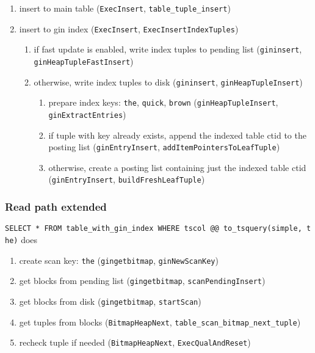 \documentclass[
]{article}
\providecommand{\tightlist}{%
  \setlength{\itemsep}{0pt}\setlength{\parskip}{0pt}}
\begin{document}
\begin{enumerate}
\def\labelenumi{\arabic{enumi}.}
\tightlist
\item
  insert to main table (\texttt{ExecInsert},
  \texttt{table\_tuple\_insert})
\item
  insert to gin index (\texttt{ExecInsert},
  \texttt{ExecInsertIndexTuples})

  \begin{enumerate}
  \def\labelenumii{\arabic{enumii}.}
  \tightlist
  \item
    if fast update is enabled, write index tuples to pending list
    (\texttt{gininsert}, \texttt{ginHeapTupleFastInsert})
  \item
    otherwise, write index tuples to disk (\texttt{gininsert},
    \texttt{ginHeapTupleInsert})

    \begin{enumerate}
    \def\labelenumiii{\arabic{enumiii}.}
    \tightlist
    \item
      prepare index keys: \texttt{the}, \texttt{quick}, \texttt{brown}
      (\texttt{ginHeapTupleInsert}, \texttt{ginExtractEntries})
    \item
      if tuple with key already exists, append the indexed table ctid to
      the posting list (\texttt{ginEntryInsert},
      \texttt{addItemPointersToLeafTuple})
    \item
      otherwise, create a posting list containing just the indexed table
      ctid (\texttt{ginEntryInsert}, \texttt{buildFreshLeafTuple})
    \end{enumerate}
  \end{enumerate}
\end{enumerate}

\hypertarget{read-path-extended}{%
\subsubsection{Read path extended}\label{read-path-extended}}

\texttt{SELECT\ *\ FROM\ table\_with\_gin\_index\ WHERE\ tscol\ @@\ to\_tsquery(\textquotesingle{}simple\textquotesingle{},\ \textquotesingle{}the\textquotesingle{})}
does

\begin{enumerate}
\def\labelenumi{\arabic{enumi}.}
\tightlist
\item
  create scan key: \texttt{the} (\texttt{gingetbitmap},
  \texttt{ginNewScanKey})
\item
  get blocks from pending list (\texttt{gingetbitmap},
  \texttt{scanPendingInsert})
\item
  get blocks from disk (\texttt{gingetbitmap}, \texttt{startScan})
\item
  get tuples from blocks (\texttt{BitmapHeapNext},
  \texttt{table\_scan\_bitmap\_next\_tuple})
\item
  recheck tuple if needed (\texttt{BitmapHeapNext},
  \texttt{ExecQualAndReset})
\end{enumerate}
\end{document}
